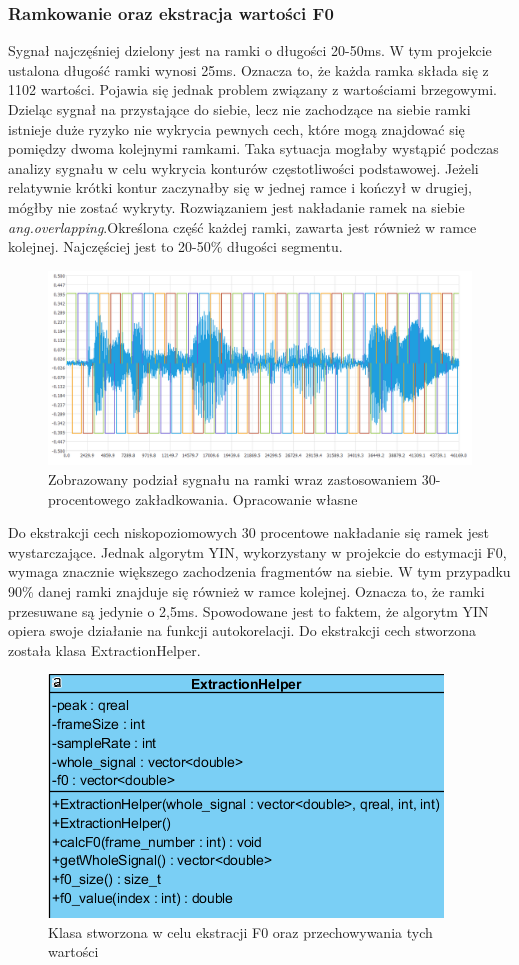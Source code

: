 \documentclass[a4paper,12 pt]{article}
\begin{document}
\subsubsection{Ramkowanie oraz ekstracja wartości F0}
Sygnał najczęśniej dzielony jest na ramki o długości 20-50ms. W tym projekcie ustalona długość ramki wynosi 25ms. Oznacza to, że każda ramka składa się z 1102 wartości.
Pojawia się jednak problem związany z wartościami brzegowymi. Dzieląc sygnał na przystające do siebie, lecz nie zachodzące na siebie ramki istnieje duże ryzyko nie wykrycia pewnych cech, które mogą znajdować się pomiędzy dwoma kolejnymi ramkami. 
Taka sytuacja mogłaby wystąpić podczas analizy sygnału w celu wykrycia konturów częstotliwości podstawowej. Jeżeli relatywnie krótki kontur zaczynałby się w jednej ramce i kończył w drugiej, mógłby nie zostać wykryty.
Rozwiązaniem jest nakładanie ramek na siebie \textit{ang.overlapping}.Określona część każdej ramki, zawarta jest również w ramce kolejnej. Najczęściej jest to 20-50\% długości segmentu.
\begin{figure}[h]
\includegraphics[scale=0.7]{overlapping.png}
\caption{Zobrazowany podział sygnału na ramki wraz zastosowaniem 30-procentowego zakładkowania. Opracowanie własne}
\end{figure}
\FloatBarrier
Do ekstrakcji cech niskopoziomowych 30 procentowe nakładanie się ramek jest wystarczające. Jednak algorytm YIN, wykorzystany w projekcie do estymacji F0, wymaga znacznie większego zachodzenia fragmentów na siebie. W tym przypadku 90\% danej ramki znajduje się również w ramce kolejnej.
Oznacza to, że ramki przesuwane są jedynie o 2,5ms. Spowodowane jest to faktem, że algorytm YIN opiera swoje działanie na funkcji autokorelacji.
Do ekstrakcji cech stworzona została klasa ExtractionHelper.
\FloatBarrier
\begin{figure}[h]
\centering
\includegraphics[scale=0.9]{featuresExtractor.png}
\caption{Klasa stworzona w celu ekstracji F0 oraz przechowywania tych wartości}
\end{figure}
\end{document}
